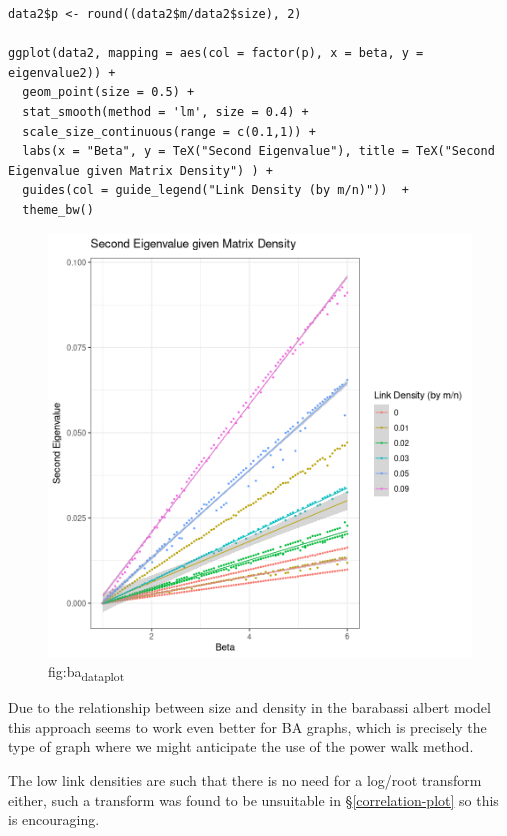 \documentclass[11pt]{article}
\begin{document}
\begin{listing}[htbp]
\begin{verbatim}
data2$p <- round((data2$m/data2$size), 2)

ggplot(data2, mapping = aes(col = factor(p), x = beta, y = eigenvalue2)) +
  geom_point(size = 0.5) +
  stat_smooth(method = 'lm', size = 0.4) +
  scale_size_continuous(range = c(0.1,1)) +
  labs(x = "Beta", y = TeX("Second Eigenvalue"), title = TeX("Second Eigenvalue given Matrix Density") ) +
  guides(col = guide_legend("Link Density (by m/n)"))  +
  theme_bw()
\end{verbatim}
\caption{\label{l:ba_data_plot}l:ba\textsubscript{data}\textsubscript{plot}}
\end{listing}


\begin{figure}[htbp]
\centering
\includegraphics[width=12cm]{media/constant_dens_ba_density_sqrt.png}
\caption{\label{fig:ba_data_plot}fig:ba\textsubscript{data}\textsubscript{plot}}
\end{figure}

Due to the relationship between size and density in the barabassi albert model this approach seems to work even better for BA graphs, which is precisely the type of graph where we might anticipate the use of the power walk method.

The low link densities are such that there is no need for a log/root transform either, such a transform was found to be unsuitable in \S \ref{correlation-plot} so this is encouraging.
\end{document}
